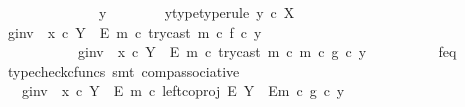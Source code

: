 \begin{isabellebody}
\ \ \ \ \isamarkupfalse%
\ {\isacharminus}{\kern0pt}\isanewline
\ \ \ \ \ \ \isamarkupfalse%
\ y\isanewline
\ \ \ \ \ \ \isamarkupfalse%
\ y{\isacharunderscore}{\kern0pt}type{\isacharbrackleft}{\kern0pt}type{\isacharunderscore}{\kern0pt}rule{\isacharbrackright}{\kern0pt}{\isacharcolon}{\kern0pt}\ {\isachardoublequoteopen}y\ {\isasymin}\isactrlsub c\ X{\isachardoublequoteclose}\isanewline
\isanewline
\ \ \ \ \ \ \isamarkupfalse%
\ {\isachardoublequoteopen}{\isacharparenleft}{\kern0pt}g{\isacharunderscore}{\kern0pt}inv\ {\isasymamalg}\ {\isacharparenleft}{\kern0pt}x\ {\isasymcirc}\isactrlsub c\ {\isasymbeta}\isactrlbsub Y\ {\isasymsetminus}\ {\isacharparenleft}{\kern0pt}E{\isacharcomma}{\kern0pt}\ m{\isacharparenright}{\kern0pt}\isactrlesub {\isacharparenright}{\kern0pt}\ {\isasymcirc}\isactrlsub c\ try{\isacharunderscore}{\kern0pt}cast\ m{\isacharparenright}{\kern0pt}\ {\isasymcirc}\isactrlsub c\ f\ {\isasymcirc}\isactrlsub c\ y\isanewline
\ \ \ \ \ \ \ \ \ \ {\isacharequal}{\kern0pt}\ g{\isacharunderscore}{\kern0pt}inv\ {\isasymamalg}\ {\isacharparenleft}{\kern0pt}x\ {\isasymcirc}\isactrlsub c\ {\isasymbeta}\isactrlbsub Y\ {\isasymsetminus}\ {\isacharparenleft}{\kern0pt}E{\isacharcomma}{\kern0pt}\ m{\isacharparenright}{\kern0pt}\isactrlesub {\isacharparenright}{\kern0pt}\ {\isasymcirc}\isactrlsub c\ {\isacharparenleft}{\kern0pt}try{\isacharunderscore}{\kern0pt}cast\ m\ {\isasymcirc}\isactrlsub c\ m{\isacharparenright}{\kern0pt}\ {\isasymcirc}\isactrlsub c\ g\ {\isasymcirc}\isactrlsub c\ y{\isachardoublequoteclose}\isanewline
\ \ \ \ \ \ \ \ \isamarkupfalse%
\ f{\isacharunderscore}{\kern0pt}eq\ \isamarkupfalse%
\ {\isacharparenleft}{\kern0pt}typecheck{\isacharunderscore}{\kern0pt}cfuncs{\isacharcomma}{\kern0pt}\ smt\ comp{\isacharunderscore}{\kern0pt}associative{}{\isacharparenright}{\kern0pt}\isanewline
\ \ \ \ \ \ \isamarkupfalse%
\ \isamarkupfalse%
\ {\isachardoublequoteopen}{\isachardot}{\kern0pt}{\isachardot}{\kern0pt}{\isachardot}{\kern0pt}\ {\isacharequal}{\kern0pt}\ {\isacharparenleft}{\kern0pt}g{\isacharunderscore}{\kern0pt}inv\ {\isasymamalg}\ {\isacharparenleft}{\kern0pt}x\ {\isasymcirc}\isactrlsub c\ {\isasymbeta}\isactrlbsub Y\ {\isasymsetminus}\ {\isacharparenleft}{\kern0pt}E{\isacharcomma}{\kern0pt}\ m{\isacharparenright}{\kern0pt}\isactrlesub {\isacharparenright}{\kern0pt}\ {\isasymcirc}\isactrlsub c\ left{\isacharunderscore}{\kern0pt}coproj\ E\ {\isacharparenleft}{\kern0pt}Y\ {\isasymsetminus}\ {\isacharparenleft}{\kern0pt}E{\isacharcomma}{\kern0pt}m{\isacharparenright}{\kern0pt}{\isacharparenright}{\kern0pt}{\isacharparenright}{\kern0pt}\ {\isasymcirc}\isactrlsub c\ g\ {\isasymcirc}\isactrlsub c\ y{\isachardoublequoteclose}\isanewline

\end{isabellebody}
